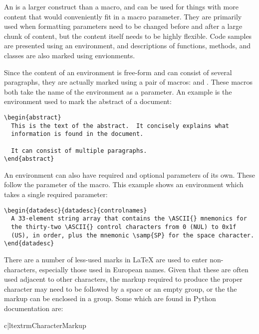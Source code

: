 \documentclass{howto}
\begin{document}
    An  is a larger construct than a macro, and can
    be used for things with more content that would conveniently fit
    in a macro parameter.  They are primarily used when formatting
    parameters need to be changed before and after a large chunk of
    content, but the content itself needs to be highly flexible.  Code
    samples are presented using an environment, and descriptions of
    functions, methods, and classes are also marked using envionments.

    Since the content of an environment is free-form and can consist
    of several paragraphs, they are actually marked using a pair of
    macros:  and .  These macros both take the
    name of the environment as a parameter.  An example is the
    environment used to mark the abstract of a document:

\begin{verbatim}
\begin{abstract}
  This is the text of the abstract.  It concisely explains what
  information is found in the document.

  It can consist of multiple paragraphs.
\end{abstract}
\end{verbatim}

    An environment can also have required and optional parameters of
    its own.  These follow the parameter of the  macro.
    This example shows an environment which takes a single required
    parameter:

\begin{verbatim}
\begin{datadesc}{datadesc}{controlnames}
  A 33-element string array that contains the \ASCII{} mnemonics for
  the thirty-two \ASCII{} control characters from 0 (NUL) to 0x1f
  (US), in order, plus the mnemonic \samp{SP} for the space character.
\end{datadesc}
\end{verbatim}

    There are a number of less-used marks in \LaTeX{} are used to
    enter non-\ASCII{} characters, especially those used in European
    names.  Given that these are often used adjacent to other
    characters, the markup required to produce the proper character
    may need to be followed by a space or an empty group, or the the
    markup can be enclosed in a group.  Some which are found in Python
    documentation are:

\begin{tableii}{c|l}{textrm}{Character}{Markup}
\end{tableii}
\end{document}
